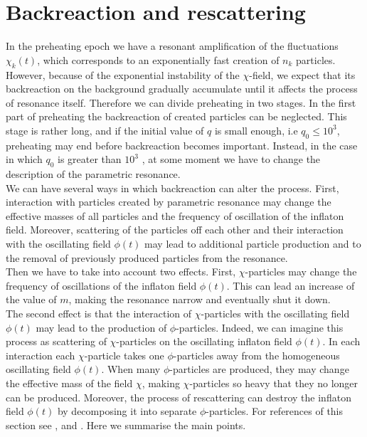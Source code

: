\documentclass[11pt,a4paper,twoside]{book}
\begin{document}
\section{Backreaction and rescattering}
In the preheating epoch we have a resonant amplification of the fluctuations $ \chi_{k}(t) $, which corresponds to an exponentially fast creation of $ n_{k} $ particles. However, because of the exponential  instability of the $\chi$-field, we expect that its backreaction on the background gradually accumulate until it affects the process of resonance itself. Therefore we can divide preheating in two stages. In  the first part of preheating  the backreaction of created particles can be neglected. This stage is rather long, and if the initial value of $ q $ is small enough, i.e $ q_{0} \le 10^{3} $, preheating may end before backreaction becomes important. Instead, in the case in which $ q_{0} $ is greater than $ 10^{3}$																																															
, at some moment we have to change the description of the parametric resonance.\\
We can have several ways in which backreaction can alter the process. First, interaction with particles created by parametric resonance may change the effective masses of all particles and the frequency of oscillation of the inflaton field. Moreover, scattering of the particles off each other and their interaction with the oscillating field $ \phi(t) $ may lead to additional particle production and to the removal of previously produced particles from the resonance.\\
Then we have to take into account two effects. First, $\chi$-particles may change the frequency of oscillations of the inflaton field $ \phi(t) $. This can lead an increase of the value of $ m $, making the resonance narrow and eventually shut it down.\\
The second effect is that the interaction of $ \chi $-particles with the oscillating field $ \phi(t) $ may lead to the production of $ \phi $-particles. Indeed, we can imagine this process as scattering of $ \chi $-particles on the oscillating inflaton field $ \phi(t) $. In each interaction each $\chi$-particle takes one $\phi$-particles away from the homogeneous oscillating field $ \phi(t) $. When many $\phi$-particles are produced, they may change the effective mass of the field $\chi$, making $ \chi $-particles so heavy that they no longer can be produced. Moreover, the process of rescattering can destroy the inflaton field $ \phi(t) $ by decomposing it into separate $ \phi $-particles. For references of this section see \cite{Chap4:LindePreheatingModel},\cite{Chap4:Reference1} and \cite{Chap4:Reference2}. Here we summarise the main points.\\
\end{document}
